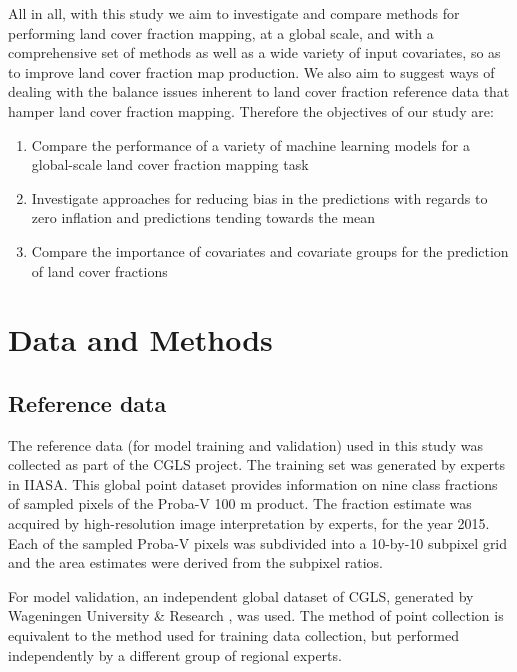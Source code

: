 \documentclass[a4paper,10pt]{article}
\begin{document}
All in all, with this study we aim to investigate and compare methods for performing land cover fraction mapping, at a global scale, and with a comprehensive set of methods as well as a wide variety of input covariates, so as to improve land cover fraction map production.
We also aim to suggest ways of dealing with the balance issues inherent to land cover fraction reference data that hamper land cover fraction mapping.
Therefore the objectives of our study are:

\begin{enumerate}
 \item Compare the performance of a variety of machine learning models for a global-scale land cover fraction mapping task
 \item Investigate approaches for reducing bias in the predictions with regards to zero inflation and predictions tending towards the mean
 \item Compare the importance of covariates and covariate groups for the prediction of land cover fractions
\end{enumerate}


\section{Data and Methods}

\subsection{Reference data}

The reference data (for model training and validation) used in this study was collected as part of the \ac{CGLS} project.
The training set was generated by experts in \ac{IIASA}.
This global point dataset provides information on nine class fractions of sampled pixels of the Proba-V 100 m product.
The fraction estimate was acquired by high-resolution image interpretation by experts, for the year 2015.
Each of the sampled Proba-V pixels was subdivided into a 10-by-10 subpixel grid and the area estimates were derived from the subpixel ratios.

For model validation, an independent global dataset of \ac{CGLS}, generated by Wageningen University \& Research \citep{tsendbazar_developing_2018}, was used.
The method of point collection is equivalent to the method used for training data collection, but performed independently by a different group of regional experts.
\end{document}
